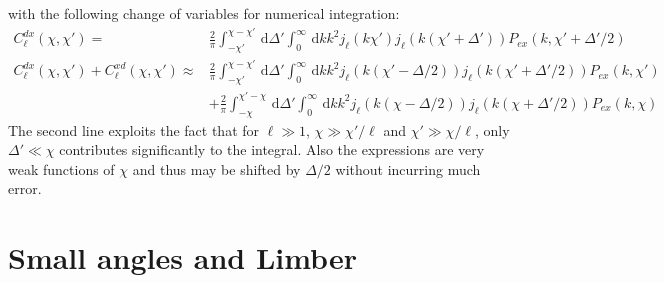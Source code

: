 \documentclass[onecolumn,prd,nofootinbib]{revtex4-1}
\newcommand{\ud}{\,\mathrm{d}}
\begin{document}
with the following change of variables for numerical integration:
\begin{align}
C^{dx}_\ell(\chi,\chi')
    =&
    \frac{2}{\pi}
    \int_{-\chi'}^{\chi - \chi'}\ud\Delta'
    \int_0^\infty\ud k k^2 j_\ell(k\chi')
    j_{\ell}(k(\chi'+\Delta'))
    P_{ex}(k, \chi' + \Delta'/2)
    \\
C^{dx}_\ell(\chi,\chi') + C^{xd}_\ell(\chi,\chi')
    \approx&
    \frac{2}{\pi}
    \int_{-\chi'}^{\chi - \chi'}\ud\Delta'
    \int_0^\infty\ud k k^2 j_\ell(k(\chi'-\Delta/2))
    j_{\ell}(k(\chi'+\Delta'/2))
    P_{ex}(k, \chi')
    \nonumber\\
    &+
    \frac{2}{\pi}
    \int_{-\chi}^{\chi' - \chi}\ud\Delta'
    \int_0^\infty\ud k k^2 j_\ell(k(\chi-\Delta/2))
    j_{\ell}(k(\chi+\Delta'/2))
    P_{ex}(k, \chi)
\end{align}
The second line exploits the fact that for $\ell \gg 1$, $\chi \gg \chi'/\ell$ and
$\chi' \gg \chi/\ell$, only $\Delta'\ll\chi$ contributes significantly to the
integral. Also the expressions are very weak functions of $\chi$ and thus
may be shifted by $\Delta/2$ without incurring much error.


\section{Small angles and Limber}
\end{document}
